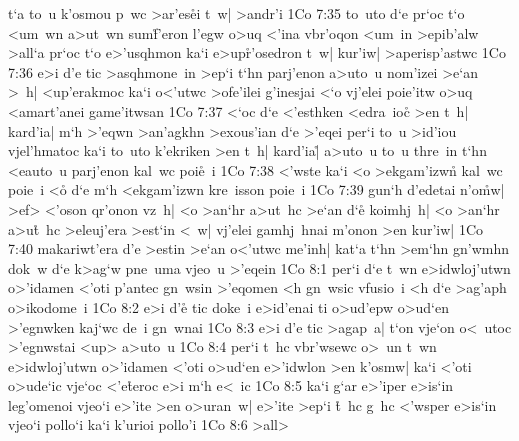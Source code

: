 t`a
to~u
k'osmou
p~wc
>ar'es\r{e}i
t~w|
>andr'i\bibvsend
\vs 1Co 7:35
to~uto
d`e
pr`oc
t`o
<um~wn
a>ut~wn
sum\r{f}'eron
l'egw
o>uq
<'ina
vbr'oqon
<um~in
>epib'alw
>all`a
pr`oc
t`o
e>'usqhmon
ka`i
e>up\r{r}'osedron
t~w|
kur'iw|
>aperisp'astwc\bibvsend
\vs 1Co 7:36
e>i
d'e
tic
>asqhmone~in
>ep`i
t`hn
parj'enon
a>uto~u
nom'izei
>e`an
>~h|
<up'erakmoc
ka`i
o<'utwc
>ofe'ilei
g'inesjai
<`o
vj'elei
poie'itw
o>uq
<amart'anei
game'itwsan\bibvsend
\vs 1Co 7:37
<`oc
d`e
<'esthken
<edra~ioc\r{}
>en
t~h|
kard'ia|
m`h
>'eqwn
>an'agkhn
>exous'ian
d`e
>'eqei
per`i
to~u
>id'iou
vjel'hmatoc
ka`i
to~uto
k'ekriken
>en
t~h|
kard'ia|\r{}
a>uto~u
to~u
thre~in
t`hn
<eauto~u
parj'enon
kal~wc
poi\r{e}~i\bibvsend
{}
\vs 1Co 7:38
<'wste
ka`i
<o
>ekgam'izwn\r{}
kal~wc
poie~i
<o\r{}
d`e
m`h
<ekgam'izwn
kre~isson
poie~i\bibvsend
\vs 1Co 7:39
gun`h
d'edetai
n'o\r{m}w|
>ef>
<'oson
qr'onon
vz~h|
<o
>an`hr
a>ut~hc
>e`an
d`e\r{}
koimhj~h|
<o
>an`hr
a>u\r{t}~hc
>eleuj'era
>est`in
<~w|
vj'elei
gamhj~hnai
m'onon
>en
kur'iw|\bibvsend
\vs 1Co 7:40
makariwt'era
d'e
>estin
>e`an
o<'utwc
me'inh|
kat`a
t`hn
>em`hn
gn'wmhn
dok~w
d`e
k>ag`w
pne~uma
vjeo~u
>'eqein\bibvsend
\vs 1Co 8:1
per`i
d`e
t~wn
e>idwloj'utwn
o>'idamen
<'oti
p'antec
gn~wsin
>'eqomen
<h
gn~wsic
vfusio~i
<h
d`e
>ag'aph
o>ikodome~i\bibvsend
\vs 1Co 8:2
e>i
d'e\r{}
tic
doke~i
e>id'enai
ti
o>ud'epw
o>ud`en
>'egnwken
kaj`wc
de~i
gn~wnai\bibvsend
\vs 1Co 8:3
e>i
d'e
tic
>agap~a|
t`on
vje`on
o<~utoc
>'egnwstai
<up>
a>uto~u\bibvsend
\vs 1Co 8:4
per`i
t~hc
vbr'wsewc
o>~un
t~wn
e>idwloj'utwn
o>'idamen
<'oti
o>ud`en
e>'idwlon
>en
k'osmw|
ka`i
<'oti
o>ude`ic
vje`oc
<'e\r{t}eroc
e>i
m`h
e<~ic\bibvsend
\vs 1Co 8:5
ka`i
g`ar
e>'iper
e>is`in
leg'omenoi
vjeo`i
e>'ite
>en
o>uran~w|
e>'ite
>ep`i
\r{t}~hc
g~hc
<'wsper
e>is`in
vjeo`i
pollo`i
ka`i
k'urioi
pollo'i\bibvsend
\vs 1Co 8:6
>all>
